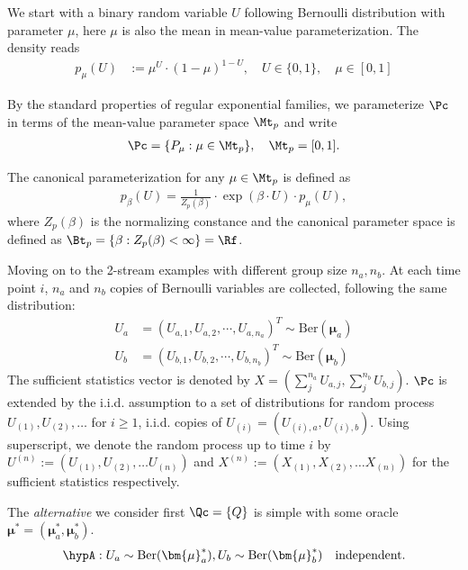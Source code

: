 We start with a binary random variable $U$
following Bernoulli distribution with parameter $\mu$,
here $\mu$ is also the mean in mean-value parameterization.
The density reads
\begin{align*}
	p_{\mu}(U)
	 & := \mu^U \cdot (1 - \mu)^{1-U}, \quad U \in \{0,1\}, \quad \mu \in [0,1]
\end{align*}

By the standard properties of regular exponential families,
we parameterize $\Pc$ in terms of the mean-value parameter space $\Mt_p$ and write
\begin{align*}
	\Pc = \{P_\mu: \mu \in \Mt_p\}, \quad \Mt_p = [0,1].
\end{align*}

The canonical parameterization for any $\mu \in \Mt_p$ is defined as
\begin{align*}
	p_{\beta}(U) = \frac{1}{Z_p(\beta)} \cdot \exp(\beta \cdot U) \cdot p_{\mu}(U),
\end{align*}
where $Z_p(\beta)$ is the normalizing constance and the canonical parameter space is
defined as $\Bt_p = \{\beta: Z_p(\beta) < \infty \} = \Rf$.

Moving on to the 2-stream examples with different group size $n_a, n_b$.
At each time point $i$, $n_a$ and $n_b$ copies of Bernoulli variables are collected,
following the same distribution:
\begin{align*}
	U_a & = (U_{a,1}, U_{a,2},\cdots,U_{a,n_a})^T \sim \mathrm{Ber}(\bm{\mu}_a) \\
	U_b & = (U_{b,1}, U_{b,2},\cdots,U_{b,n_b})^T \sim \mathrm{Ber}(\bm{\mu}_b)
\end{align*}
The sufficient statistics vector is denoted by $X = (\sum_j^{n_a}U_{a,j}, \sum_j^{n_b}U_{b,j})$.
$\Pc$ is extended by the i.i.d. assumption to
a set of distributions for random process $U_{(1)}, U_{(2)}, \dots$
for $i \geq 1$, i.i.d. copies of $U_{(i)}=(U_{(i),a}, U_{(i),b})$.
Using superscript, we denote the random process up to time $i$ by
$U^{(n)} := (U_{(1)}, U_{(2)}, \dots U_{(n)})$
and $X^{(n)} := (X_{(1)}, X_{(2)}, \dots X_{(n)})$ for the sufficient statistics respectively.

The \emph{alternative} we consider first $\Qc = \{Q\}$ is simple with some oracle
$\bm{\mu}^* = (\bm{\mu}_a^*, \bm{\mu}_b^*)$.
\begin{align*}
	\hypA: U_a \sim \mathrm{Ber}(\bm{\mu}_a^*), U_b \sim \mathrm{Ber}(\bm{\mu}_b^*) \quad
	\text{independent}.
\end{align*}


